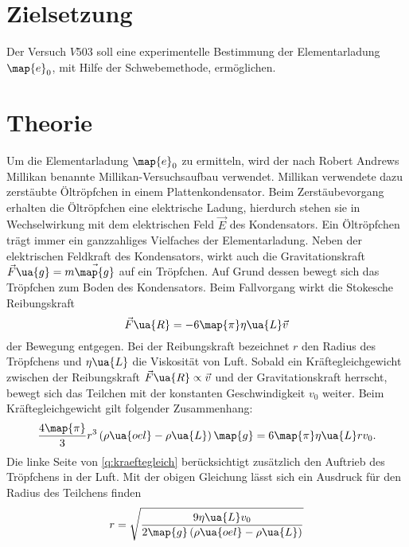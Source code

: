 \setcounter{page}{1}
\section*{Zielsetzung}
Der Versuch $V503$ soll eine experimentelle Bestimmung der Elementarladung $\map{e}_0$, mit Hilfe der Schwebemethode, ermöglichen.
\section{Theorie}
Um die Elementarladung $\map{e}_0$ zu ermitteln, wird der nach Robert Andrews Millikan benannte %
Millikan-Versuchsaufbau verwendet. Millikan verwendete dazu zerstäubte Öltröpfchen in einem %
Plattenkondensator. Beim Zerstäubevorgang erhalten die Öltröpfchen eine elektrische
Ladung, hierdurch stehen sie in Wechselwirkung mit dem elektrischen Feld $\vec{E}$ des
Kondensators. Ein Öltröpfchen trägt immer ein ganzzahliges Vielfaches der Elementarladung. %
Neben der elektrischen Feldkraft des Kondensators, wirkt auch die Gravitationskraft %
$\vec{F}\ua{g}=m\vec{\map{g}}$ auf ein Tröpfchen. %
Auf Grund dessen bewegt sich das Tröpfchen zum Boden
des Kondensators. Beim Fallvorgang wirkt die Stokesche Reibungskraft %
\begin{equation*}
  \vec{F}\ua{R}=-6\map{\pi}\eta\ua{L}\vec{v}
\end{equation*}
der Bewegung entgegen. Bei der Reibungskraft bezeichnet $r$ den Radius des
Tröpfchens und $\eta\ua{L}$ die Viskosität von Luft. Sobald ein Kräftegleichgewicht
zwischen der Reibungskraft $\vec{F}\ua{R}\propto \vec{v}$ und der Gravitationskraft
herrscht, bewegt sich das Teilchen mit der konstanten Geschwindigkeit $v_0$ weiter.
Beim Kräftegleichgewicht gilt folgender Zusammenhang:
\begin{equation}
  \label{eq:kraeftegleich}
  \frac{4\map{\pi}}{3}r^3\left(\rho\ua{oel}-\rho\ua{L}\right)\map{g}=6\map{\pi}\eta\ua{L}r v_0.
\end{equation}
Die linke Seite von \eqref{q:kraeftegleich} berücksichtigt zusätzlich den Auftrieb des %
Tröpfchens in der Luft. Mit der obigen Gleichung lässt sich ein Ausdruck für den Radius %
des Teilchens finden %
\begin{equation}
  \label{eq:radius_teilchen}
  r=\sqrt{\frac{9\eta\ua{L}v_0}{2\map{g}\left(\rho\ua{oel}-\rho\ua{L}\right)}}
\end{equation}
